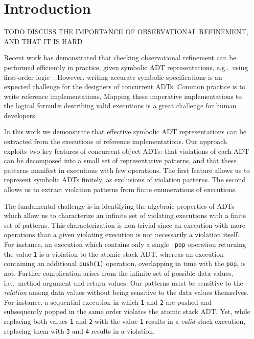 \section{Introduction}
\label{sec:intro}

TODO DISCUSS THE IMPORTANCE OF OBSERVATIONAL REFINEMENT, AND THAT IT IS HARD

Recent work has demonstrated that checking observational refinement can be
performed efficiently in practice, given symbolic ADT representations,
e.g.,~using first-order logic~\cite{conf/popl/BouajjaniEEH15,
conf/pldi/EmmiEH15}. However, writing accurate symbolic specifications is an
expected challenge for the designers of concurrent ADTs. Common practice is to
write reference implementations. Mapping these imperative implementations to
the logical formulæ describing valid executions is a great challenge for human
developers.

In this work we demonstrate that effective symbolic ADT representations can be
extracted from the executions of reference implementations. Our approach
exploits two key features of concurrent object ADTs: that violations of each
ADT can be decomposed into a small set of representative patterns, and that
these patterns manifest in executions with few operations. The first feature
allows us to represent symbolic ADTs finitely, as exclusions of violation
patterns. The second allows us to extract violation patterns from finite
enumerations of executions.

The fundamental challenge is in identifying the algebraic properties of ADTs
which allow us to characterize an infinite set of violating executions with a
finite set of patterns. This characterization is non-trivial since an execution
with more operations than a given violating execution is not necessarily a
violation itself. For instance, an execution which contains only a single {\tt
pop} operation returning the value {\tt 1} is a violation to the atomic stack
ADT, whereas an execution containing an additional {\tt push(1)} operation,
overlapping in time with the {\tt pop}, is not. Further complication arises
from the infinite set of possible data values, i.e.,~method argument and return
values. Our patterns must be sensitive to the \emph{relation} among data values
without being sensitive to the data values themselves. For instance, a
sequential execution in which {\tt 1} and {\tt 2} are pushed and subsequently
popped in the same order violates the atomic stack ADT. Yet, while replacing
both values {\tt 1} and {\tt 2} with the value {\tt 1} results in a
\emph{valid} stack execution, replacing them with {\tt 3} and {\tt 4} results
in a violation.

